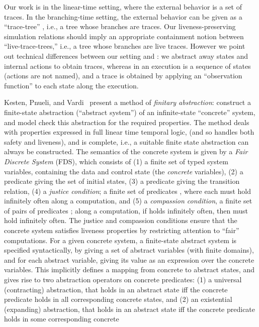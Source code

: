 \documentclass[11pt]{article}
\newcommand{\empi}[1]{\textit{#1\/}}
\begin{document}
Our work is in the linear-time setting, where the external behavior is
a set of traces. In the branching-time setting, the external behavior
can be given as a ``trace-tree'' \cite{HKR97}, i.e., a tree whose
branches are traces. Our liveness-preserving
simulation relations should imply an appropriate containment notion
between ``live-trace-trees,'' i.e., a tree whose branches are live
traces. However we point out technical differences between our setting
and \cite{AH95,HKR97}: we abstract away states and internal actions to
obtain traces, whereas in \cite{AH95,HKR97} an execution is a sequence
of states (actions are not named), and a 
trace is obtained by applying an ``observation function'' to each
state along the execution.

Kesten, Pnueli, and Vardi~\cite{KP00,KPV01} present a method of
\empi{finitary abstraction}: construct a finite-state abstraction (``abstract
system'') of an
infinite-state ``concrete'' system, and model check this abstraction for the
required properties. The method deals with properties expressed in
full linear time temporal logic, (and so handles both safety and
liveness), and is complete, i.e., a suitable finite state abstraction
can always be constructed.
The semantics of the concrete system is given by a \empi{Fair Discrete
System} (FDS), which consists of
(1) a finite set of typed system variables, containing the data and
control state (the \empi{concrete} variables),
(2) a predicate giving the set of initial states, 
(3) a predicate giving the transition relation, 
(4) a \empi{justice condition};  a finite set of predicates ,
where each  must hold infinitely often along a computation, and
(5) a \empi{compassion condition}, 
a finite set of pairs of predicates ;
along a computation, if  holds infinitely often, then
 must hold infinitely often.
The {justice} and {compassion} conditions ensure that the concrete
system satisfies liveness properties by restricting attention to
``fair'' computations.
For a given concrete system, a finite-state abstract system is
specified syntactically, by giving a set of abstract variables (with
finite domains), and for each abstract variable, giving its value as
an expression over the concrete variables. This implicitly defines a
mapping from concrete to abstract states, and gives rise to two
abstraction operators on concrete predicates: 
(1) a universal (contracting) abstraction, that holds in an abstract
state iff the concrete predicate holds in all corresponding concrete
states, and 
(2) an existential (expanding) abstraction, that holds in an abstract
state iff the concrete predicate holds in some corresponding concrete
\end{document}
